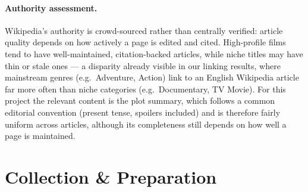 \documentclass[sigconf]{acmart}
\begin{document}
\paragraph{Authority assessment.} Wikipedia's authority is crowd-sourced rather than
centrally verified: article quality depends on how actively a page is edited and
cited. High-profile films tend to have well-maintained, citation-backed articles,
while niche titles may have thin or stale ones --- a disparity already visible in our
linking results, where mainstream genres (e.g.\ Adventure, Action) link to an English
Wikipedia article far more often than niche categories (e.g.\ Documentary, TV Movie).
For this project the relevant content is the plot summary, which follows a common
editorial convention (present tense, spoilers included) and is therefore fairly
uniform across articles, although its completeness still depends on how well a page
is maintained.

\section{Collection \& Preparation}
\end{document}
